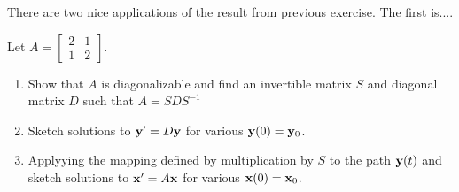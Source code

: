 \documentclass[10pt]{article}
\begin{document}
There are two nice applications of the result from previous exercise. The first is....
\begin{exercise}
    Let $A = \begin{bmatrix}
        2&1\\1&2
    \end{bmatrix}$.
    \begin{enumerate}[label=(\alph*)]
        \item Show that $A$ is diagonalizable and find an invertible matrix $S$ and diagonal matrix $D$ such that $A=SDS^{-1}$
        \item Sketch solutions to $\mathbf{y}'=D\mathbf{y}$ for various $\mathbf{y}(0)=\mathbf{y}_0$.
        \item Applyying the mapping defined by multiplication by $S$ to the path $\mathbf{y}(t)$ and sketch solutions to $\mathbf{x}'=A\mathbf{x}$ for various $\mathbf{x}(0)=\mathbf{x}_0$.
    \end{enumerate}
\end{exercise}
\end{document}
